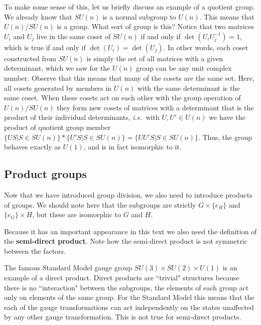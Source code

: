 \documentclass[notes.tex]{subfiles}
\begin{document}
To make some sense of this, let us briefly discuss an example of a quotient group. We already know that $SU(n)$ is a normal subgroup to $U(n)$. This means that $U(n)/SU(n)$ is a group. What sort of group is this? Notice that two matrices $U_i$ and $U_j$ live in the same coset of $SU(n)$ if and only if $\det(U_iU_j^{-1})=1$, which is true if and only if $\det(U_i)=\det(U_j)$. In other words, each coset constructed from $SU(n)$ is simply the set of all matrices with a given determinant, which we saw for the $U(n)$ group can be any unit complex number. Observe that this means that many of the cosets are the same set. Here, all cosets generated by members in $U(n)$ with the same determinant is the same coset. 
When these cosets act on each other with the group operation of $U(n)/SU(n)$ they form new cosets of matrices with a determinant that is the product of their individual determinants, {\it i.e.}\ with $U,U'\in U(n)$ we have the product of quotient group member $\{US|S\in SU(n)\}*\{U'S| S\in SU(n)\}=\{ UU'S| S\in SU(n)\}$. Thus, the group behaves exactly as $U(1)$, and is in fact isomorphic to it.

\subsection{Product groups}
Now that we have introduced group division,  we also need to introduce products of groups. 
We should note here that the subgroups are strictly $G\times\{e_H\}$ and $\{e_G\}\times H$, but these are isomorphic to $G$ and $H$.

Because it has an important appearance in this text we also need the definition of the {\bf semi-direct product}.
Note how the semi-direct product is not symmetric between the factors.

The famous Standard Model gauge group $SU(3) \times SU(2)\times U(1)$ is an example of a direct product. Direct products are ``trivial" structures because there is no ``interaction" between the subgroups, the elements of each group act only on elements of the same group. For the Standard Model this means that the each of the gauge transformations can act independently on the states unaffected by any other gauge transformation. This is not true for semi-direct products. 
\end{document}
